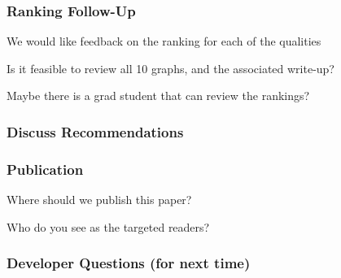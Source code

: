 \documentclass[t,12pt,numbers,fleqn]{beamer}
\begin{document}
\begin{frame}
\frametitle{Ranking Follow-Up}

\bi
\item We would like feedback on the ranking for each of the qualities
\item Is it feasible to review all 10 graphs, and the associated write-up?
\item Maybe there is a grad student that can review the rankings?
 \ei

\end{frame}


\begin{frame}
\frametitle{Discuss Recommendations}

\bi
\item 
\ei

\end{frame}


\begin{frame}
\frametitle{Publication}

\bi
\item Where should we publish this paper?
\item Who do you see as the targeted readers?
\ei

\end{frame}


\begin{frame}
\frametitle{Developer Questions (for next time)}

\bi
\item 
\ei

\end{frame}

\end{document}
